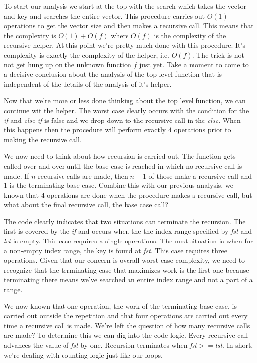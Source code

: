 \documentclass[nobib]{tufte-handout}
\begin{document}
To start our analysis we start at the top with the search which takes the vector and key and searches the entire vector. This procedure carries out $O(1)$ operations to get the vector size and then makes a recursive call. This means that the complexity is $O(1) + O(f)$ where $O(f)$ is the complexity of the recursive helper. At this point we're pretty much done with this procedure.  It's complexity is exactly the complexity of the helper, i.e. $O(f)$. The trick is not not get hung up on the unknown function $f$ just yet. Take a moment to come to a decisive conclusion about the analysis of the top level function that is independent of the details of the analysis of it's helper.

Now that we're more or less done thinking about the top level function, we can continue wit the helper. The worst case clearly occurs with the condition for the \textit{if} and \textit{else if} is false and we drop down to the recursive call in the \textit{else}.  When this happens then the procedure will perform exactly $4$ operations prior to making the recursive call.

We now need to think about how recursion is carried out. The function gets called over and over until the base case is reached in which no recursive call is made. If $n$ recursive calls are made, then $n-1$ of those make a recursive call and $1$ is the terminating base case. Combine this with our previous analysis, we known that $4$ operations are done when the procedure makes a recursive call, but what about the final recursive call, the base case call?

The code clearly indicates that two situations can terminate the recursion. The first is covered by the \textit{if} and occurs when the the index range specified by \textit{fst} and \textit{lst} is empty. This case requires a single operations. The next situation is when for a non-empty index range, the key is found at \textit{fst}. This case requires three operations. Given that our concern is overall worst case complexity, we need to recognize that the terminating case that maximizes work is the first one because terminating there means we've searched an entire index range and not a part of a range.

We now known that one operation, the work of the terminating base case, is carried out outside the repetition and that four operations are carried out every time a recursive call is made. We're left the question of how many recursive calls are made? To determine this we can dig into the code logic. Every recursive call advances the value of \textit{fst} by one. Recursion terminates when \textit{fst}$>=$\textit{lst}. In short, we're dealing with counting logic just like our loops.
\end{document}
